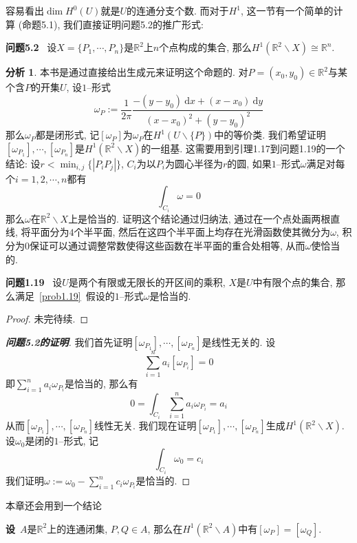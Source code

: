 \documentclass[11pt]{article}
\theoremstyle{definition}\newtheorem*{analyse}{分析}
\def\d#1{\ \mathrm{d}#1}
\newenvironment{env}[1]{\par\vspace{1em}\noindent\textbf{#1}\ }{\par\vspace{1em}}
\begin{document}
容易看出$\dim H^0(U)$就是$U$的连通分支个数.
而对于$H^1$, 这一节有一个简单的计算 (命题5.1), 我们直接证明问题5.2的推广形式:
\begin{env}{问题5.2}
    设$X=\{P_1,\cdots,P_n\}$是$\mathbb{R}^2$上$n$个点构成的集合, 那么$H^1(\mathbb{R}^2\backslash X)\cong\mathbb{R}^n$.
\end{env}
\begin{analyse}
    本书是通过直接给出生成元来证明这个命题的.
    对$P=(x_0,y_0)\in\mathbb{R}^2$与某个含$P$的开集$U$, 设$1$--形式
    \[\omega_P:=\frac{1}{2\pi}\frac{-(y-y_0)\d{x}+(x-x_0)\d{y}}{(x-x_0)^2+(y-y_0)^2}\]
    那么$\omega_P$都是闭形式, 记$[\omega_P]$为$\omega_P$在$H^1(U\backslash\{P\})$中的等价类.
    我们希望证明$[\omega_{P_1}],\cdots,[\omega_{P_n}]$是$H^1(\mathbb{R}^2\backslash X)$的一组基.
    这需要用到引理1.17到问题1.19的一个结论:
    设$r<\min_{i,j}\{|P_iP_j|\}$, $C_i$为以$P_i$为圆心半径为$r$的圆, 如果$1$--形式$\omega$满足对每个$i=1,2,\cdots,n$都有
    \begin{equation}
        \int_{C_i}\omega=0\label{prob1.19}
    \end{equation}
    那么$\omega$在$\mathbb{R}^2\backslash X$上是恰当的.
    证明这个结论通过归纳法, 通过在一个点处画两根直线, 将平面分为$4$个半平面, 然后在这四个半平面上均存在光滑函数使其微分为$\omega$,
    积分为$0$保证可以通过调整常数使得这些函数在半平面的重合处相等, 从而$\omega$使恰当的.
\end{analyse}
\begin{env}{问题1.19}
    设$U$是两个有限或无限长的开区间的乘积, $X$是$U$中有限个点的集合, 那么满足~\eqref{prob1.19}~假设的$1$--形式$\omega$是恰当的.
\end{env}
\begin{proof}
    未完待续.
\end{proof}
\begin{proof}[{\bf 问题5.2的证明}]
    我们首先证明$[\omega_{P_1}],\cdots,[\omega_{P_n}]$是线性无关的.
    设
    \[\sum_{i=1}^na_i[\omega_{P_i}]=0\]
    即$\sum_{i=1}^na_i\omega_{P_i}$是恰当的, 那么有
    \[0=\int_{C_i}\sum_{i=1}^na_i\omega_{P_i}=a_i\]
    从而$[\omega_{P_1}],\cdots,[\omega_{P_n}]$线性无关.
    我们现在证明$[\omega_{P_1}],\cdots,[\omega_{P_n}]$生成$H^1(\mathbb{R}^2\backslash X)$.
    设$\omega_0$是闭的$1$--形式, 记
    \[\int_{C_i}\omega_0=c_i\]
    我们证明$\omega:=\omega_0-\sum_{i=1}^nc_i\omega_{P_i}$是恰当的.
\end{proof}

本章还会用到一个结论
\begin{env}
    设$A$是$\mathbb{R}^2$上的连通闭集, $P,Q\in A$, 那么在$H^1(\mathbb{R}^2\backslash A)$中有$[\omega_P]=[\omega_Q]$.
\end{env}
\end{document}
